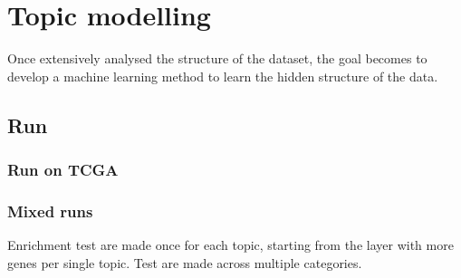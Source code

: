 \chapter{Topic modelling}\label{ch:topicmodelling}
Once extensively analysed the structure of the dataset, the goal becomes to develop a machine learning method to learn the hidden structure of the data.









\section{Run}




\subsection{Run on TCGA}

\subsection{Mixed runs}


Enrichment test are made once for each topic, starting from the layer with more genes per 
single topic. Test are made across multiple categories.